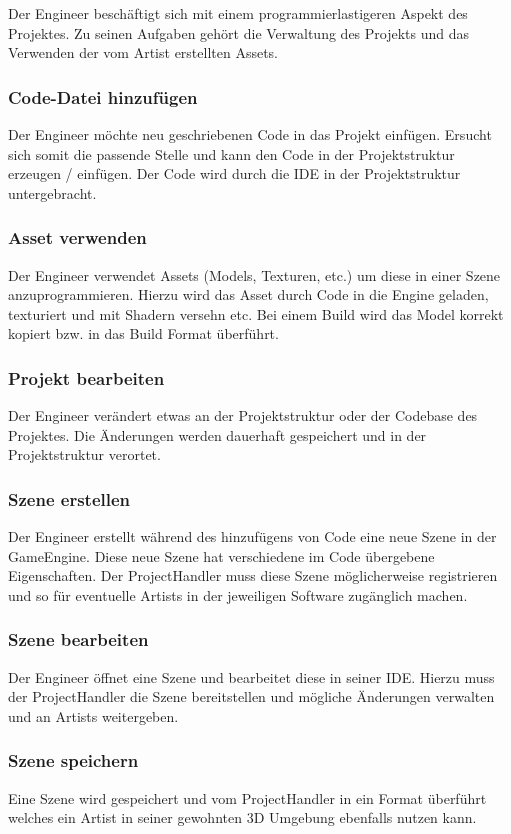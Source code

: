 \documentclass[pagesize, paper=a4, fontsize=12pt,titlepage=true, headings=small, headnosepline, abstractoff, liststotoc, nochapterprefix, plainheadsepline, twoside]{scrreprt}
\begin{document}
Der Engineer beschäftigt sich mit einem programmierlastigeren Aspekt des Projektes. Zu seinen Aufgaben gehört die Verwaltung des Projekts und das Verwenden der vom Artist erstellten Assets.

\subsubsection{Code-Datei hinzufügen}
Der Engineer möchte neu geschriebenen Code in das Projekt einfügen. Ersucht sich somit die passende Stelle und kann den Code in der Projektstruktur erzeugen / einfügen. Der Code wird durch die IDE in der Projektstruktur untergebracht.

\subsubsection{Asset verwenden}
Der Engineer verwendet Assets (Models, Texturen, etc.) um diese in einer Szene anzuprogrammieren. Hierzu wird das Asset durch Code in die Engine geladen, texturiert und mit Shadern versehn etc. Bei einem Build wird das Model korrekt kopiert bzw. in das Build Format überführt.

\subsubsection{Projekt bearbeiten}
Der Engineer verändert etwas an der Projektstruktur oder der Codebase des Projektes. Die Änderungen werden dauerhaft gespeichert und in der Projektstruktur verortet.

\subsubsection{Szene erstellen}
Der Engineer erstellt während des hinzufügens von Code eine neue Szene in der GameEngine. Diese neue Szene hat verschiedene im Code übergebene Eigenschaften. Der ProjectHandler muss diese Szene möglicherweise registrieren und so für eventuelle Artists in der jeweiligen Software zugänglich machen.

\subsubsection{Szene bearbeiten}
Der Engineer öffnet eine Szene und bearbeitet diese in seiner IDE. Hierzu muss der ProjectHandler die Szene bereitstellen und mögliche Änderungen verwalten und an Artists weitergeben.

\subsubsection{Szene speichern}
Eine Szene wird gespeichert und vom ProjectHandler in ein Format überführt welches ein Artist in seiner gewohnten 3D Umgebung ebenfalls nutzen kann.
\end{document}
